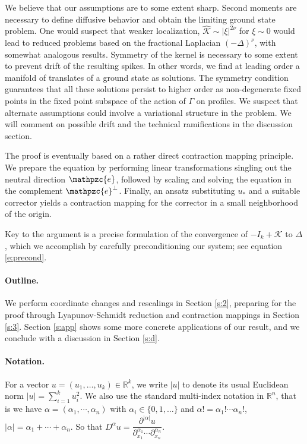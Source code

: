 \documentclass[10pt]{article}
\newcommand{\R}{\mathbb{R}}
\newcommand{\K}{\mathcal{K}}
\newcommand{\e}{\mathpzc{e}}
\begin{document}
We believe that our assumptions are to some extent sharp. Second moments are necessary to define diffusive behavior and obtain the limiting ground state problem. One would suspect that weaker localization, $\hat{\K}\sim |\xi|^{2\nu}$ for $\xi\sim 0$ would lead to reduced problems based on the fractional Laplacian $(-\Delta)^\nu$, with somewhat analogous results. Symmetry of the kernel is necessary to some extent to prevent drift of the resulting spikes. In other words, we find at leading order a manifold of translates of a ground state as solutions. The symmetry condition guarantees that all these solutions persist to higher order as non-degenerate fixed points in the fixed point subspace of the action of $\Gamma$ on profiles. We suspect that alternate assumptions could involve a variational structure in the problem. We will comment on possible drift and the technical ramifications in the discussion section.

The proof is eventually based on a rather direct contraction mapping principle. We prepare the equation by performing linear transformations singling out the neutral direction ${\e}$, followed by scaling and solving the equation in the complement ${\e}^\perp$. Finally, an ansatz substituting $u_*$ and a suitable corrector yields a contraction mapping for the corrector in a small neighborhood of the origin. 

Key to the argument is a precise formulation of the convergence of $-I_k+\K$ to $\Delta$, which we accomplish by carefully preconditioning our system; see equation \eqref{e:precond}.


\paragraph{Outline.} We perform coordinate changes and rescalings in Section \ref{s:2}, preparing for the proof through Lyapunov-Schmidt reduction and contraction mappings in Section \ref{s:3}. Section \ref{s:app} shows some more concrete applications of our result, and we conclude with a discussion in Section \ref{s:d}.

\paragraph{Notation.}

For a vector $u=(u_1,\ldots,u_k) \in \R^k$, we write $|u|$ to denote its usual Euclidean norm $|u| = \sum_{i=1}^{k} u_i^2$. We also use the standard multi-index notation in $\R^n$, that is we have $\alpha = (\alpha_1,\cdots,\alpha_n)$ with $\alpha_i \in \{0,1,\ldots \}$ and $\alpha! = \alpha_1!\cdots\alpha_n!$, $|\alpha|=\alpha_1+\cdots+\alpha_n$. So that 
$D^\alpha u = \dfrac{\partial^{|\alpha |} u}{\partial_{x_1}^{\alpha_1}\cdots \partial_{x_n}^{\alpha_n}}$.
\end{document}
